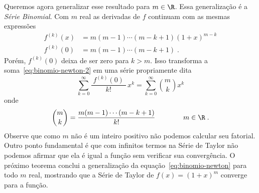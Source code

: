 Queremos agora generalizar esse resultado para $m\in \R$.
Essa generalização é a \emph{Série Binomial}.
Com $m$ real as derivadas de $f$ continuam com as mesmas expressões
\begin{align*}
  f^{(k)}(x) & = m(m-1)\cdots (m-k+1)(1+x)^{m-k} \\
  f^{(k)}(0) & = m(m-1)\cdots (m-k+1)     \;.
\end{align*}
Porém, $f^{(k)}(0)$ deixa de ser zero para $k>m$. Isso transforma a
soma~\eqref{eq:binomio-newton-2} em uma série propriamente dita
\[
  \sum_{k=0}^\infty \frac{\;f^{(k)}(0)\;}{k!}\,x^k =
  \sum_{k=0}^\infty \binom{m}{k} x^k
\]
onde
\[
  \binom{m}{k} = \frac{m(m-1)\cdots(m-k+1)}{k!}
  \qquad\qquad m \in \R     \;.
\]
Observe que como $m$ não é um inteiro positivo não podemos calcular seu
fatorial.
Outro ponto fundamental é que com infinitos termos na Série de Taylor
não podemos afirmar que ela é igual a função sem verificar sua
convergência.
O próximo teorema conclui a generalização da
equação~\eqref{eq:binomio-newton} para todo $m$ real,
mostrando que a Série de Taylor de $f(x)=(1+x)^m$ converge para a função.

